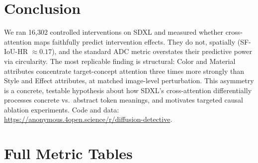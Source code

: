 \documentclass{article}
\begin{document}
\section{Conclusion}
\label{sec:conclusion}

We ran 16{,}302 controlled interventions on SDXL and measured
whether cross-attention maps faithfully predict intervention effects.
They do not, spatially (SF-IoU-HR $\approx 0.17$), and the standard
ADC metric overstates their predictive power via circularity.
The most replicable finding is structural: Color and Material
attributes concentrate target-concept attention three times more
strongly than Style and Effect attributes, at matched image-level
perturbation.  This asymmetry is a concrete, testable hypothesis
about how SDXL's cross-attention differentially processes concrete
vs.\ abstract token meanings, and motivates targeted causal
ablation experiments.  Code and data:
\url{https://anonymous.4open.science/r/diffusion-detective}.




\clearpage
\appendix
\onecolumn

\section{Full Metric Tables}
\label{app:tables}
\end{document}
